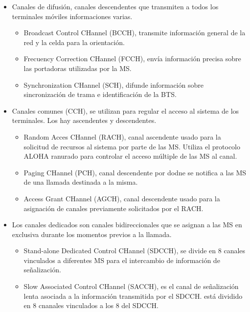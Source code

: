 \begin{itemize}
	\item Canales de difusión, canales descendentes que transmiten a todos los terminales móviles informaciones varias.
	\begin{itemize}
		\item Broadcast Control CHannel (BCCH), transmite información general de la red y la celda para la orientación.
		\item Frecuency Correction CHannel (FCCH), envía información precisa sobre las portadoras utilizadas por la MS.
		\item Synchronization CHannel (SCH), difunde información sobre sincronización de trama e identificación de la BTS.
	\end{itemize}
	\item Canales comunes (CCH), se utilizan para regular el acceso al sistema de los terminales. Los hay ascendentes y descendentes.
	\begin{itemize}
		\item Random Acces CHannel (RACH), canal ascendente usado para la solicitud de recursos al sistema por parte de las MS. Utiliza el protocolo ALOHA ranurado para controlar el acceso múltiple de las MS al canal.
		\item Paging CHannel (PCH), canal descendente por dodne se notifica a las MS  de una llamada destinada a la misma.
		\item Access Grant CHannel (AGCH), canal descendente usado para la asignación de canales previamente solicitados por el RACH.
	\end{itemize}
	\item Los canales dedicados son canales bidireccionales que se asignan a las MS en exclusiva durante los momentos previos a la llamada.
	\begin{itemize}
		\item Stand-alone Dedicated Control CHannel (SDCCH), se divide en 8 canales vinculados a diferentes MS para el intercambio de información de señalización.
		\item Slow Associated Control CHannel (SACCH), es el canal de señalización lenta asociada a la información transmitida por el SDCCH. está dividido en 8 cnanales vinculados a los 8 del SDCCH.
	\end{itemize}
\end{itemize}
